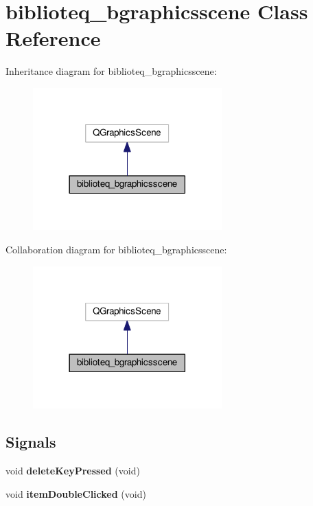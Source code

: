 \hypertarget{classbiblioteq__bgraphicsscene}{}\section{biblioteq\+\_\+bgraphicsscene Class Reference}
\label{classbiblioteq__bgraphicsscene}


Inheritance diagram for biblioteq\+\_\+bgraphicsscene\+:
\nopagebreak
\begin{figure}[H]
\begin{center}
\leavevmode
\includegraphics[width=206pt]{classbiblioteq__bgraphicsscene__inherit__graph}
\end{center}
\end{figure}


Collaboration diagram for biblioteq\+\_\+bgraphicsscene\+:
\nopagebreak
\begin{figure}[H]
\begin{center}
\leavevmode
\includegraphics[width=206pt]{classbiblioteq__bgraphicsscene__coll__graph}
\end{center}
\end{figure}
\subsection*{Signals}
\begin{DoxyCompactItemize}
\item 
void {\bfseries delete\+Key\+Pressed} (void)\hypertarget{classbiblioteq__bgraphicsscene_a8553f29440d58e306eba748ed0d96135}{}\label{classbiblioteq__bgraphicsscene_a8553f29440d58e306eba748ed0d96135}

\item 
void {\bfseries item\+Double\+Clicked} (void)\hypertarget{classbiblioteq__bgraphicsscene_affd52d53ab37e9ff7a3aaeeda1713b23}{}\label{classbiblioteq__bgraphicsscene_affd52d53ab37e9ff7a3aaeeda1713b23}

\end{DoxyCompactItemize}
